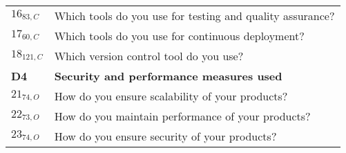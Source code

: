 \begin{table}
{\begin{tabular}{l|l}
        {$16_{83, C}$} & Which tools do you use for testing and quality assurance? \\
        
        {$17_{60, C}$} & Which tools do you use for continuous deployment?\\ 
        
        {$18_{121, C}$} & Which version control tool do you use? \\
        {\bf{D4}} & \bf{Security  and  performance  measures used} \\ 
        \midrule
        {$21_{74, O}$} & How do you ensure scalability of your products?                               \\ %
        {$22_{73, O}$} & How do you maintain performance of your products?                               \\ %
        {$23_{74, O}$} & How do you ensure security of your products?\\
        \bottomrule
    \end{tabular}%
    }
    \label{table:survey_questions_1}
\end{table}